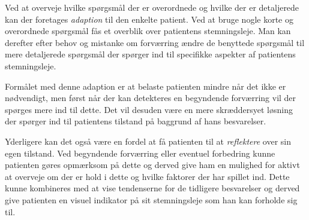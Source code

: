 Ved at overveje hvilke spørgsmål der er overordnede og hvilke der er detaljerede kan der foretages \emph{adaption} til den enkelte patient.
Ved at bruge nogle korte og overordnede spørgsmål fås et overblik over patientens stemningsleje.
Man kan derefter efter behov og mistanke om forværring ændre de benyttede spørgsmål til mere detaljerede spørgsmål der spørger ind til specifikke aspekter af patientens stemningsleje.

Formålet med denne adaption er at belaste patienten mindre når det ikke er nødvendigt, men først når der kan detekteres en begyndende forværring vil der spørges mere ind til dette.
Det vil desuden være en mere skræddersyet løsning der spørger ind til patientens tilstand på baggrund af hans besvarelser.

Yderligere kan det også være en fordel at få patienten til at \emph{reflektere} over sin egen tilstand.
Ved begyndende forværring eller eventuel forbedring kunne patienten gøres opmærksom på dette og derved give ham en mulighed for aktivt at overveje om der er hold i dette og hvilke faktorer der har spillet ind.
Dette kunne kombineres med at vise tendenserne for de tidligere besvarelser og derved give patienten en visuel indikator på sit stemningsleje som han kan forholde sig til.